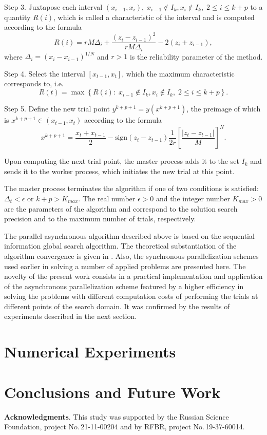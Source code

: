 \documentclass{svproc}
\begin{document}
Step 3. Juxtapose each interval $(x_{i-1},x_i), \; x_{i-1} \notin I_k, x_i \notin I_k, \; 2\leq i\leq k+p$ to a quantity $R(i)$, which is called a characteristic of the interval and is computed according to the formula
\[
R(i)=rM\Delta_i+\frac{(z_i-z_{i-1})^2}{rM\Delta_i}-2(z_i+z_{i-1}),
\]
where $\Delta_i=\left(x_i-x_{i-1}\right)^{1/N}$ and $r>1$ is the reliability parameter of the method.

Step 4. Select the interval $[x_{t-1},x_t]$, which the maximum characteristic corresponds to, i.e.
\[
R(t) = \max \left\{ R(i): \; x_{i-1} \notin I_k, x_i \notin I_k, \; 2\leq i\leq k+p \right\}.
\]

Step 5. Define the new trial point $y^{k+p+1}=y(x^{k+p+1})$, the preimage of which is $x^{k+p+1} \in (x_{t-1},x_t)$ according to the formula
\[
x^{k+p+1} = \frac{x_{t}+x_{t-1}}{2} - \mathrm{sign}(z_{t}-z_{t-1})\frac{1}{2r}\left[\frac{\left|z_{t}-z_{t-1}\right|}{M}\right]^N.
\]

Upon computing the next trial point, the master process adds it to the set $I_k$ and sends it to the worker process, which initiates the new trial at this point. 

The master process terminates the algorithm if one of two conditions is satisfied: $\Delta_{t}<\epsilon$ or $k+p>K_{max}$.
The real number $\epsilon>0$ and the integer number $K_{max}>0$ are the parameters of the algorithm and correspond to the solution search precision and to the maximum number of trials, respectively.

The parallel asynchronous algorithm described above is based on the sequential information global search algorithm. The theoretical substantiation of the algorithm convergence is given in \cite{Strongin2000}. Also, the synchronous parallelization schemes used earlier in solving a number of applied problems \cite{Kalyulin2017,Modorskii2016} are presented here.
The novelty of the present work consists in a practical implementation and application of the asynchronous parallelization scheme featured by a higher efficiency in solving the problems with different computation costs of performing the trials at different points of the search domain. 
It was confirmed by the results of experiments described in the next section.

\section{Numerical Experiments}\label{Sec_Exp}




\section{Conclusions and Future Work}



\medskip

\textbf{Acknowledgments}. This study was supported by the Russian Science Foundation, project No.\,21-11-00204 and by RFBR, project No.\,19-37-60014.

%
%

{}
\end{document}
